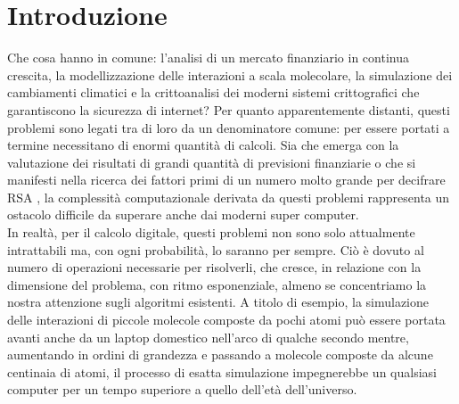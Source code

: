 \documentclass[12pt,a4paper,openright]{report}
\begin{document}
\chapter{Introduzione}
Che cosa hanno in comune: l'analisi di un mercato finanziario in continua crescita, la modellizzazione delle interazioni a scala molecolare, la simulazione dei cambiamenti climatici 
e la crittoanalisi dei moderni sistemi crittografici che garantiscono la sicurezza di internet?
Per quanto apparentemente distanti, questi problemi sono legati tra di loro da un denominatore comune: per essere portati a termine necessitano di enormi quantità di calcoli.
Sia che emerga con la valutazione dei risultati di grandi quantità di previsioni finanziarie o che si manifesti nella ricerca dei fattori primi di un numero molto grande per decifrare RSA \cite{ref22},
la complessità computazionale derivata da questi problemi rappresenta un ostacolo difficile da superare anche dai moderni super computer.\\
In realtà, per il calcolo digitale, questi problemi non sono solo attualmente intrattabili ma, con ogni probabilità, lo saranno per sempre. Ciò è dovuto al numero di operazioni necessarie per risolverli,
che cresce, in relazione con la dimensione del problema, con ritmo esponenziale, almeno se concentriamo la nostra attenzione sugli algoritmi esistenti.
A titolo di esempio, la simulazione delle interazioni di piccole molecole composte da pochi atomi può essere portata avanti anche da un laptop domestico nell'arco di qualche secondo mentre, aumentando in ordini di grandezza e 
passando a molecole composte da alcune centinaia di atomi, il processo di esatta simulazione impegnerebbe un qualsiasi computer per un tempo superiore a quello dell'età dell'universo.
\end{document}
